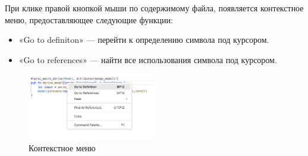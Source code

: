 При клике правой кнопкой мыши по содержимому файла, появляется контекстное меню, предоставляющее следующие функции:

\begin{itemize}
    \item «Go to definiton» — перейти к определению символа под курсором.
    \item «Go to references» — найти все использования символа под курсором.
\end{itemize}

\begin{figure}[H]
    \centering
    \includegraphics[width=0.5\textwidth]{figures/menu.png}
    \caption{Контекстное меню}
\end{figure}

\clearpage